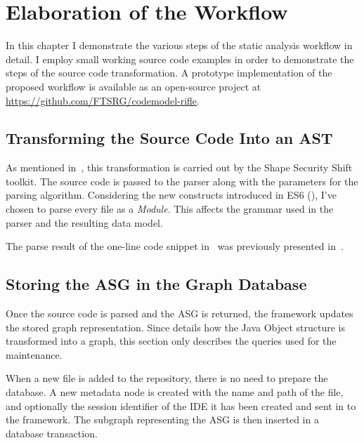 \chapter{Elaboration of the Workflow}
\label{chap:elaboration-of-the-workflow}

In this chapter I demonstrate the various steps of the static analysis workflow in detail. I employ small working source code examples in order to demonstrate the steps of the source code transformation. A prototype implementation of the proposed workflow is available as an open-source project at {\small\url{https://github.com/FTSRG/codemodel-rifle}}.

\section{Transforming the Source Code Into an AST}
As mentioned in~, this transformation is carried out by the Shape Security Shift toolkit. The source code is passed to the parser along with the parameters for the parsing algorithm. Considering the new constructs introduced in ES6 (), I've chosen to parse every file as a \emph{Module}. This affects the grammar used in the parser and the resulting data model.

The parse result of the one-line code snippet in~ was previously presented in~.

\begin{figure}[!htb]
	\begin{minipage}{\textwidth}
		
	\end{minipage}
\end{figure}

\section{Storing the ASG in the Graph Database}
Once the source code is parsed and the ASG is returned, the framework updates the stored graph representation. Since  details how the Java Object structure is transformed into a graph, this section only describes the queries used for the maintenance.

When a new file is added to the repository, there is no need to prepare the database. A new metadata node is created with the name and path of the file, and optionally the session identifier of the IDE it has been created and sent in to the framework. The subgraph representing the ASG is then inserted in a database transaction.

